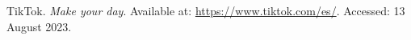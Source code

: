\begin{thebibliography}{2}
	TikTok. \textit{Make your day}. Available at: \url{https://www.tiktok.com/es/}. Accessed: 13 August 2023.
\end{thebibliography}
